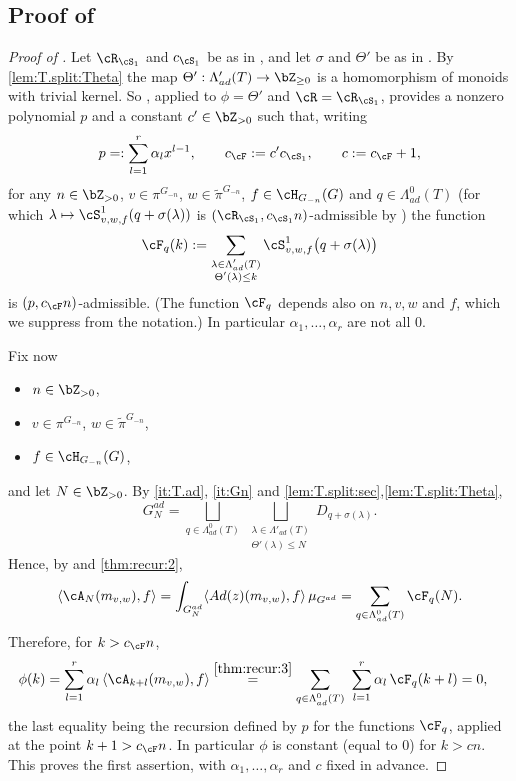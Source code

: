 \documentclass[12pt,a4paper]{amsart}%
\newcommand{\RamiD}[1]{{{#1}}}
\begin{document}
\subsection{Proof of }\label{ssec:pf.recur}
\begin{proof}[Proof of ]
Let $\cR_{\cS_1}$ and $c_{\cS_1}$ be as in , and let $\sigma$ and $\Theta'$ be as in . By \eqref{lem:T.split:Theta} the map $\Theta':\Lambda'_{ad}(T)\to \Z_{\geq0}$ is a homomorphism of monoids with trivial kernel. So , applied to $\phi=\Theta'$ and $\cR=\cR_{\cS_1}$, provides a nonzero polynomial $p$ and a constant $c'\in\Z_{>0}$ such that, writing
$$p=:\sum_{l=1}^r\alpha_lx^{l-1},\qquad c_{\cF}:=c'c_{\cS_1},\qquad \RamiD{c}:=c_{\cF}+1 ,$$
for any $n\in\Z_{>0}$, $v\in\pi^{G_{-n}}$, $w\in\tilde\pi^{G_{-n}}$, $f\in\cH_{G_{-n}}(G)$ and $q\in \Lambda^0_{ad}(T)$ (for which $\lambda\mapsto \cS^1_{v,w,f}(q+\sigma(\lambda))$ is $(\cR_{\cS_1},c_{\cS_1}n)$-admissible by ) the function
\begin{equation}\label{thm:recur:2}
\cF_{q}(k):=\sum_{\substack{\lambda\in \Lambda'_{ad}(T)\\ \Theta'(\lambda)\leq k}}\cS^1_{v,w,f}\bigl(q+\sigma(\lambda)\bigr)
\end{equation}
is $(p,c_{\cF}n)$-admissible. (The function $\cF_q$ depends also on $n,v,w$ and $f$, which we suppress from the notation.) In particular $\alpha_1,\dots,\alpha_r$ are not all $0$.

Fix now
    \begin{itemize}
        \item $n\in \Z_{>0}$,
    \item $v \in \pi^{G_{-n}}$,  $w\in \tilde\pi^{G_{-n}}$,
    \item $f\in \cH_{G_{-n}}(G)$,
    \end{itemize}
and let $N\in \Z_{>0}$. By \eqref{it:T.ad}, \eqref{it:Gn} and \eqref{lem:T.split:sec},\eqref{lem:T.split:Theta},
$$G^{ad}_N=\bigsqcup_{q\in \Lambda^0_{ad}(T)}\ \bigsqcup_{\substack{\lambda\in \Lambda'_{ad}(T)\\ \Theta'(\lambda)\leq N}} D_{q+\sigma(\lambda)} .$$
Hence, by  and \eqref{thm:recur:2},
\begin{equation}\label{thm:recur:3}
\langle\cA_N(m_{v,w}),f\rangle=\int_{G^{ad}_N}\langle Ad(z)(m_{v,w}),f\rangle\,\mu_{G^{ad}}=\sum_{q\in \Lambda^0_{ad}(T)}\cF_q(N).
\end{equation}
Therefore, for $k> c_{\cF} n$,
\begin{align*}
\phi(k)&=\sum_{l=1}^r\alpha_l\,\langle\cA_{k+l}(m_{v,w}),f\rangle
\overset{\eqref{thm:recur:3}}{=}\sum_{q\in \Lambda^0_{ad}(T)}\ \sum_{l=1}^r\alpha_l\,\cF_q(k+l)=0 ,
\end{align*}
the last equality being the recursion defined by $p$ for the functions $\cF_q$, applied at the point $k+1>c_{\cF}n$. In particular $\phi$ is constant (equal to $0$) for $k>\RamiD{c} n$. This proves the first assertion, with $\alpha_1,\dots,\alpha_r$ and $\RamiD{c}$ fixed in advance.


\end{proof}
\end{document}
